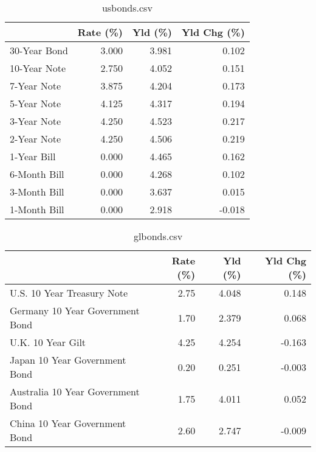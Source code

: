 \documentclass{article}%
\begin{document}
%


\begin{table}[htbp]%
\caption{usbonds.csv}%
\centering%
\begin{adjustbox}{width=1\textwidth}%
\begin{tabular}{lrrr}
\toprule
             &  Rate (\%) &  Yld (\%) &  Yld Chg (\%) \\
\midrule
30-Year Bond &     3.000 &    3.981 &        0.102 \\
10-Year Note &     2.750 &    4.052 &        0.151 \\
 7-Year Note &     3.875 &    4.204 &        0.173 \\
 5-Year Note &     4.125 &    4.317 &        0.194 \\
 3-Year Note &     4.250 &    4.523 &        0.217 \\
 2-Year Note &     4.250 &    4.506 &        0.219 \\
 1-Year Bill &     0.000 &    4.465 &        0.162 \\
6-Month Bill &     0.000 &    4.268 &        0.102 \\
3-Month Bill &     0.000 &    3.637 &        0.015 \\
1-Month Bill &     0.000 &    2.918 &       -0.018 \\
\bottomrule
\end{tabular}
%
\end{adjustbox}%
\end{table}

%


\begin{table}[htbp]%
\caption{glbonds.csv}%
\centering%
\begin{adjustbox}{width=1\textwidth}%
\begin{tabular}{lrrr}
\toprule
                                  &  Rate (\%) &  Yld (\%) &  Yld Chg (\%) \\
\midrule
       U.S. 10 Year Treasury Note &      2.75 &    4.048 &        0.148 \\
  Germany 10 Year Government Bond &      1.70 &    2.379 &        0.068 \\
                U.K. 10 Year Gilt &      4.25 &    4.254 &       -0.163 \\
    Japan 10 Year Government Bond &      0.20 &    0.251 &       -0.003 \\
Australia 10 Year Government Bond &      1.75 &    4.011 &        0.052 \\
    China 10 Year Government Bond &      2.60 &    2.747 &       -0.009 \\
\bottomrule
\end{tabular}
%
\end{adjustbox}%
\end{table}
\end{document}
